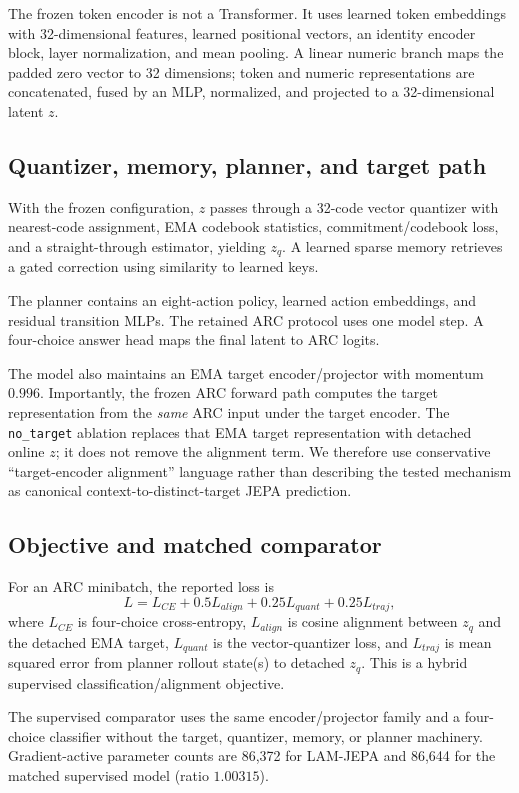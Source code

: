 \documentclass[conference]{IEEEtran}
\begin{document}
The frozen token encoder is not a Transformer. It uses learned token embeddings with 32-dimensional features, learned positional vectors, an identity encoder block, layer normalization, and mean pooling. A linear numeric branch maps the padded zero vector to 32 dimensions; token and numeric representations are concatenated, fused by an MLP, normalized, and projected to a 32-dimensional latent $z$.

\subsection{Quantizer, memory, planner, and target path}
With the frozen configuration, $z$ passes through a 32-code vector quantizer with nearest-code assignment, EMA codebook statistics, commitment/codebook loss, and a straight-through estimator, yielding $z_q$. A learned sparse memory retrieves a gated correction using similarity to learned keys.

The planner contains an eight-action policy, learned action embeddings, and residual transition MLPs. The retained ARC protocol uses one model step. A four-choice answer head maps the final latent to ARC logits.

The model also maintains an EMA target encoder/projector with momentum $0.996$. Importantly, the frozen ARC forward path computes the target representation from the \emph{same} ARC input under the target encoder. The \texttt{no\_target} ablation replaces that EMA target representation with detached online $z$; it does not remove the alignment term. We therefore use conservative ``target-encoder alignment'' language rather than describing the tested mechanism as canonical context-to-distinct-target JEPA prediction.

\subsection{Objective and matched comparator}
For an ARC minibatch, the reported loss is
\begin{equation}
L=L_{CE}+0.5L_{align}+0.25L_{quant}+0.25L_{traj},
\end{equation}
where $L_{CE}$ is four-choice cross-entropy, $L_{align}$ is cosine alignment between $z_q$ and the detached EMA target, $L_{quant}$ is the vector-quantizer loss, and $L_{traj}$ is mean squared error from planner rollout state(s) to detached $z_q$. This is a hybrid supervised classification/alignment objective.

The supervised comparator uses the same encoder/projector family and a four-choice classifier without the target, quantizer, memory, or planner machinery. Gradient-active parameter counts are 86,372 for LAM-JEPA and 86,644 for the matched supervised model (ratio $1.00315$).
\end{document}
